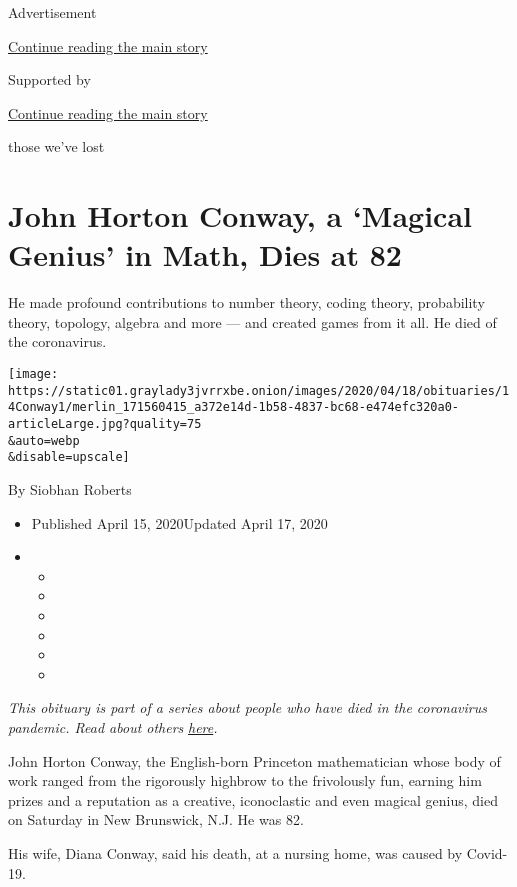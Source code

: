 Advertisement

\protect\hyperlink{after-top}{Continue reading the main story}

Supported by

\protect\hyperlink{after-sponsor}{Continue reading the main story}

those we've lost

\hypertarget{john-horton-conway-a-magical-genius-in-math-dies-at-82}{%
\section{John Horton Conway, a `Magical Genius' in Math, Dies at
82}\label{john-horton-conway-a-magical-genius-in-math-dies-at-82}}

He made profound contributions to number theory, coding theory,
probability theory, topology, algebra and more --- and created games
from it all. He died of the coronavirus.

\texttt{[image: https://static01.graylady3jvrrxbe.onion/images/2020/04/18/obituaries/14Conway1/merlin\_171560415\_a372e14d-1b58-4837-bc68-e474efc320a0-articleLarge.jpg?quality=75\\\&auto=webp\\\&disable=upscale]}

By Siobhan Roberts

\begin{itemize}
\item
  Published April 15, 2020Updated April 17, 2020
\item
  \begin{itemize}
  \item
  \item
  \item
  \item
  \item
  \item
  \end{itemize}
\end{itemize}

\emph{This obituary is part of a series about people who have died in
the coronavirus pandemic. Read about others}
\href{https://www.nytimes3xbfgragh.onion/series/people-who-have-died-of-the-coronavirus}{\emph{here}}\emph{.}

John Horton Conway, the English-born Princeton mathematician whose body
of work ranged from the rigorously highbrow to the frivolously fun,
earning him prizes and a reputation as a creative, iconoclastic and even
magical genius, died on Saturday in New Brunswick, N.J. He was 82.

His wife, Diana Conway, said his death, at a nursing home, was caused by
Covid-19.

